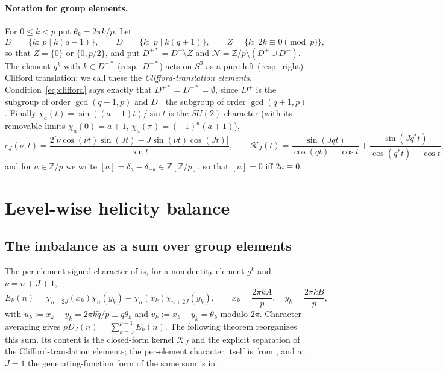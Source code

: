 \documentclass[11pt]{article}
\theoremstyle{definition}
\newcommand{\Z}{\mathbb Z}
\newcommand{\cK}{\mathcal K}
\begin{document}
\paragraph{Notation for group elements.}
For $0\leq k<p$ put $\theta_k=2\pi k/p$.  Let
\begin{equation}
 D^+=\{k:\ p\mid k(q-1)\},\qquad D^-=\{k:\ p\mid k(q+1)\},\qquad
 Z=\{k:\ 2k\equiv0\pmod p\},
 \label{eq:degenerate-sets}
\end{equation}
so that $Z=\{0\}$ or $\{0,p/2\}$, and put $D^{\pm*}=D^\pm\setminus Z$ and
$\mathcal N=\Z/p\setminus(D^+\cup D^-)$.  The element $g^k$ with
$k\in D^{+*}$ (resp.\ $D^{-*}$) acts on $S^3$ as a pure left (resp.\ right)
Clifford translation; we call these the \emph{Clifford-translation
elements}.  Condition~\eqref{eq:clifford} says exactly that
$D^{+*}=D^{-*}=\emptyset$, since $D^+$ is the subgroup of order
$\gcd(q-1,p)$ and $D^-$ the subgroup of order $\gcd(q+1,p)$.  Finally
$\chi_a(t)=\sin((a+1)t)/\sin t$ is the $SU(2)$ character
(with its removable limits $\chi_a(0)=a+1$, $\chi_a(\pi)=(-1)^a(a+1)$),
\begin{equation}
 c_J(\nu,t)=\frac{2\bigl[\nu\cos(\nu t)\sin(Jt)-J\sin(\nu t)\cos(Jt)\bigr]}
 {\sin t},
 \qquad
 \cK_J(t)=\frac{\sin(Jqt)}{\cos(qt)-\cos t}+\frac{\sin(Jq^*t)}{\cos(q^*t)-\cos t},
 \label{eq:cJ-KJ}
\end{equation}
and for $a\in\Z/p$ we write $[a]=\delta_a-\delta_{-a}\in\Z[\Z/p]$, so
that $[a]=0$ iff $2a\equiv0$.

\section{Level-wise helicity balance}
\label{sec:balance}

\subsection{The imbalance as a sum over group elements}

The per-element signed character of \cite[Sec.~5.1]{MahmoodP1Collection2026}
is, for a nonidentity element $g^k$ and $\nu=n+J+1$,
\begin{equation}
 E_k(n)=\chi_{n+2J}(x_k)\chi_n(y_k)-\chi_n(x_k)\chi_{n+2J}(y_k),
 \qquad
 x_k=\frac{2\pi kA}{p},\quad y_k=\frac{2\pi kB}{p},
 \label{eq:Ek}
\end{equation}
with $u_k:=x_k-y_k=2\pi k\tilde q/p\equiv q\theta_k$ and
$v_k:=x_k+y_k=\theta_k$ modulo $2\pi$.  Character averaging gives
$pD_J(n)=\sum_{k=0}^{p-1}E_k(n)$.  The following theorem reorganizes this
sum.  Its content is the closed-form kernel $\cK_J$ and the explicit
separation of the Clifford-translation elements; the per-element
character itself is from \cite{MahmoodP1Collection2026}, and at $J=1$ the
generating-function form of the same sum is in
\cite[Thm.~5.5, Cor.~5.8, Ex.~5.9]{Bar2019}.
\end{document}
